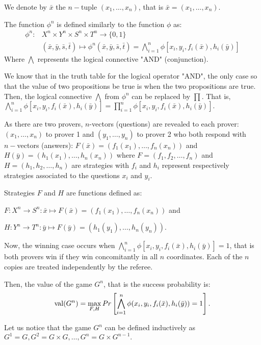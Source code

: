 We denote by  $\bar{x}$ the $n-$tuple $(x_1,\ldots, x_n)$, that is $\bar{x}=(x_1,\ldots, x_n)$. 

The function $\phi^n$ is defined similarly to the function $ \phi$ as:
\begin{align*}
\phi^n: & X^n \times Y^n \times S^n \times T^n  \longrightarrow  \{0,1\}\\ 
& (\bar{x}, \bar{y},\bar{s}, \bar{t})  \longmapsto  \phi^n(\bar{x}, \bar{y},\bar{s}, \bar{t}) = \bigwedge\limits_{i=1}^n \phi [x_i,y_i, f_i(\bar{x}), h_i(\bar{y})]
\end{align*}
Where $\bigwedge$ represents the logical connective "AND" (conjunction).

We know that in the truth table for the logical operator "AND", the only case so that the value of two propositions be true is when the two propositions are true. Then, the logical connective $\bigwedge$ from $\phi^n$ can be replaced by $\prod.$ That is,  $\bigwedge\limits_{i=1}^n \phi [x_i,y_i, f_i(\bar{x}), h_i(\bar{y})]=\prod\limits_{i=1}^n  \phi [x_i,y_i, f_i(\bar{x}), h_i(\bar{y})].$

As there are two provers, $n$-vectors (questions) are revealed to each prover:  $(x_1, \ldots , x_n)$ to prover 1 and  $(y_1, \ldots , y_n)$ to prover 2 who both respond with $n-$vectors (answers): $F(\bar{x})=(f_1(x_1), \ldots , f_n(x_n))$ and $H(\bar{y})=(h_1(x_1), \ldots , h_n(x_n))$ where $F=(f_1, f_2, \ldots, f_n)$ and $H=(h_1, h_2, \ldots, h_n)$ are strategies with $f_i$ and $h_i$ represent respectively strategies associated to the questions $x_i$ and $y_i.$

Strategies $F$ and $H$ are functions defined as:

 $F: X^n \longrightarrow S^n: \bar{x} \longmapsto F(\bar{x})=(f_1(x_1), \ldots , f_n(x_n))$ and 
 
 $H: Y^n \longrightarrow T^n: \bar{y} \longmapsto F(\bar{y})=(h_1(y_1), \ldots , h_n(y_n))$.

Now, the winning case occurs when ${\bigwedge\limits_{i=1}^n \phi [x_i,y_i, f_i(\bar{x}), h_i(\bar{y})]=1}$, that is both provers win if they win concomitantly in all $n$ coordinates. Each of the $n$ copies are treated independently by the referee.

Then, the value of the game $G^n$, that is the success probability is: $$\mathrm{val} (G^n) =\max_{F,H}Pr \left[\bigwedge\limits_{i=1}^n \phi (x_i,y_i, f_i(\bar{x}), h_i(\bar{y}))=1 \right].$$

Let us notice that the game $G^n$ can be defined inductively as $G^1=G, G^2=G \times G, \ldots, G^n=G\times G^{n-1}.$
 
